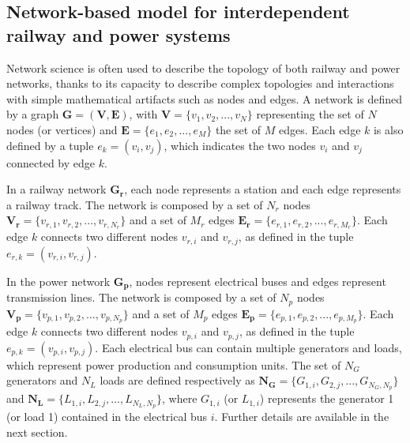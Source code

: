 \documentclass[review]{elsarticle}
\begin{document}
	
	
	\subsection{Network-based model for interdependent railway and power systems}
	
	Network science is often used to describe the topology of both railway and power networks, thanks to its capacity to describe complex topologies and interactions with simple mathematical artifacts such as nodes and edges. A network is defined by a graph $\mathbf{G}=(\mathbf{V}, \mathbf{E})$, with $\mathbf{V} = \{ v_1, v_2,...,v_N \}$ representing the set of $N$ nodes (or vertices) and $\mathbf{E} = \{ e_1, e_2,...,e_M \}$ the set of $M$ edges. Each edge $k$ is also defined by a tuple $e_k=(v_i,v_j)$, which indicates the two nodes $v_i$ and $v_j$ connected by edge $k$.
	
	In a railway network $\mathbf{G_r}$, each node represents a station and each edge represents a railway track. The network is composed by a set of $N_r$ nodes $\mathbf{V_r}=\{ v_{r,1}, v_{r,2},...,v_{r,N_r} \}$ and a set of $M_r$ edges $\mathbf{E_r}=\{ e_{r,1}, e_{r,2},...,e_{r,M_r} \}$. Each edge $k$ connects two different nodes $v_{r,i}$ and $v_{r,j}$, as defined in the tuple $e_{r,k} = (v_{r,i}, v_{r,j})$.
	
	In the power network $\mathbf{G_p}$, nodes represent electrical buses and edges represent transmission lines. The network is composed by a set of $N_p$ nodes $\mathbf{V_p}=\{ v_{p,1}, v_{p,2},...,v_{p,N_p} \}$ and a set of $M_p$ edges $\mathbf{E_p}=\{ e_{p,1}, e_{p,2},...,e_{p,M_p} \}$. Each edge $k$ connects two different nodes $v_{p,i}$ and $v_{p,j}$, as defined in the tuple $e_{p,k} = (v_{p,i}, v_{p,j})$. Each electrical bus can contain multiple generators and loads, which represent power production and consumption units. The set of $N_G$ generators and $N_L$ loads are defined respectively as $\mathbf{N_G}=\{ G_{1,i}, G_{2,j},...,G_{N_G, N_p} \}$ and $\mathbf{N_L}=\{ L_{1,i}, L_{2,j},...,L_{N_L,N_p} \}$, where $G_{1,i}$ (or $L_{1,i}$) represents the generator 1 (or load 1) contained in the electrical bus $i$. Further details are available in the next section.
	
\end{document}
